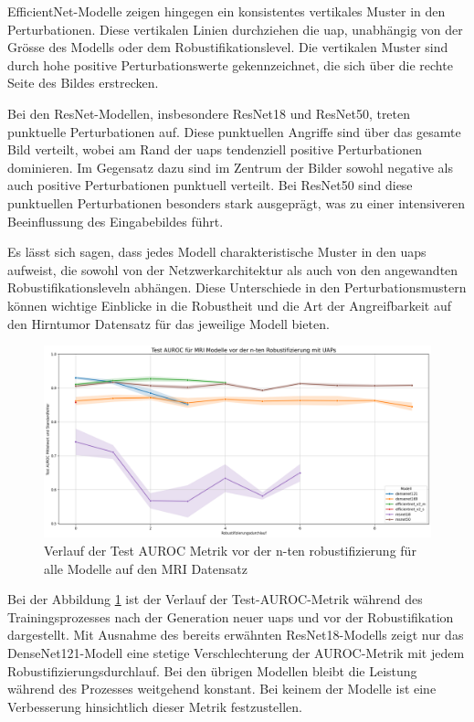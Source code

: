 EfficientNet-Modelle zeigen hingegen ein konsistentes vertikales Muster in den Perturbationen. Diese vertikalen Linien durchziehen die \acrshort{uap}, unabhängig von der Grösse des Modells oder dem Robustifikationslevel. Die vertikalen Muster sind durch hohe positive Perturbationswerte gekennzeichnet, die sich über die rechte Seite des Bildes erstrecken.

Bei den ResNet-Modellen, insbesondere ResNet18 und ResNet50, treten punktuelle Perturbationen auf. Diese punktuellen Angriffe sind über das gesamte Bild verteilt, wobei am Rand der \acrshort{uap}s tendenziell positive Perturbationen dominieren. Im Gegensatz dazu sind im Zentrum der Bilder sowohl negative als auch positive Perturbationen punktuell verteilt. Bei ResNet50 sind diese punktuellen Perturbationen besonders stark ausgeprägt, was zu einer intensiveren Beeinflussung des Eingabebildes führt.

Es lässt sich sagen, dass jedes Modell charakteristische Muster in den \acrshort{uap}s aufweist, die sowohl von der Netzwerkarchitektur als auch von den angewandten Robustifikationsleveln abhängen. Diese Unterschiede in den Perturbationsmustern können wichtige Einblicke in die Robustheit und die Art der Angreifbarkeit auf den Hirntumor Datensatz für das jeweilige Modell bieten. 

\begin{figure}[H]
    \centering
    \includegraphics[width=\linewidth]{01-images/05-resultate/VerlaufAUROC_MRI.png}
    \caption{Verlauf der Test AUROC Metrik vor der n-ten \Gls{robustifizierung} für alle Modelle auf den MRI Datensatz}
    \label{fig:VerlaufAUROC_MRI}
\end{figure}

Bei der Abbildung \ref{fig:VerlaufAUROC_MRI} ist der Verlauf der Test-AUROC-Metrik während des Trainingsprozesses nach der Generation neuer \acrshort{uap}s und vor der Robustifikation dargestellt. Mit Ausnahme des bereits erwähnten ResNet18-Modells zeigt nur das DenseNet121-Modell eine stetige Verschlechterung der AUROC-Metrik mit jedem Robustifizierungsdurchlauf. Bei den übrigen Modellen bleibt die Leistung während des Prozesses weitgehend konstant. Bei keinem der Modelle ist eine Verbesserung hinsichtlich dieser Metrik festzustellen.

